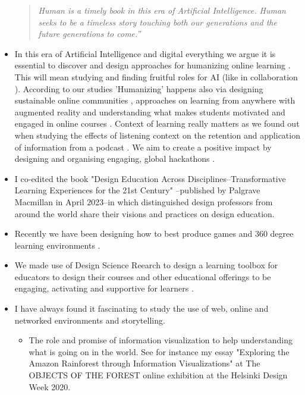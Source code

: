 \documentclass[11pt,letterpaper]{article}
\newenvironment{itquote}
{\begin{quote}\itshape}
{\end{quote}}
\begin{document}
\begin{itemize}
\begin{itquote}
Human is a timely book in this era of Artificial Intelligence. Human seeks to be a timeless story touching both our generations and the future generations to come.''
\end{itquote}
  \item In this era of Artificial Intelligence and digital everything we argue it is essential to discover and design approaches for humanizing online learning \cite{humanizing-2024}. This will mean studying and finding fruitful roles for AI (like in collaboration \cite{ai-in-collaboration-2025}). According to our studies 'Humanizing' happens also via designing sustainable online communities \cite{design-community-2024}, approaches on learning from anywhere with augmented reality \cite{CPLJ-AR-2024,learn-anywhere-ar-2024} and understanding what makes students motivated and engaged in online courses \cite{students-engagement-2024}. Context of learning really matters as we found out when studying the effects of listening context on the retention and application of information from a podcast \cite{podcast-retention-2024}. We aim to create a positive impact by designing and organising engaging, global hackathons \cite{hacking-2024}. 
  \item I co-edited the book "Design Education Across Disciplines--Transformative Learning Experiences for the 21st Century" \cite{DesignEducation2023}--published by Palgrave Macmillan in April 2023--in which distinguished design professors from around the world share their visions and practices on design education.
  \item Recently we have been designing how to best produce games \cite{gamejams-2021,game-production-2022,Promotypes2023,templating-games-2024} and 360 degree learning environments \cite{production-pipeline-360}. 
  \item We made use of Design Science Reearch to design a learning toolbox for educators to design their courses and other educational offerings to be engaging, activating and supportive for learners \cite{designing-toolbox-2022}.
  \item I have always found it fascinating to study the use of web, online and
  networked environments and storytelling. 
   \begin{itemize}
    \item The role and promise of information visualization to help understanding what is going on in the world. See for instance my essay "Exploring the Amazon Rainforest through Information Visualizations" \cite{exploration-2020} at The OBJECTS OF THE FOREST online exhibition at the Helsinki Design Week 2020.

\end{itemize}
\end{itemize}
\end{document}
